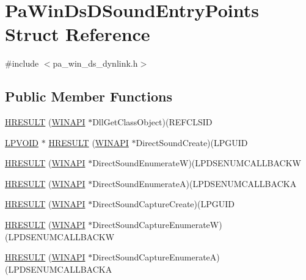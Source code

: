 \hypertarget{struct_pa_win_ds_d_sound_entry_points}{}\section{Pa\+Win\+Ds\+D\+Sound\+Entry\+Points Struct Reference}
\label{struct_pa_win_ds_d_sound_entry_points}


{\ttfamily \#include $<$pa\+\_\+win\+\_\+ds\+\_\+dynlink.\+h$>$}

\subsection*{Public Member Functions}
\begin{DoxyCompactItemize}
\item 
\hyperlink{struct_pa_win_ds_d_sound_entry_points_a7336ef5a37fdf17946fa6bf8c10c980f}{H\+R\+E\+S\+U\+LT} (\hyperlink{mapinls_8h_a9aa60e1ead64be77ad551e745cbfd4d3}{W\+I\+N\+A\+PI} $\ast$Dll\+Get\+Class\+Object)(R\+E\+F\+C\+L\+S\+ID
\item 
\hyperlink{struct_pa_win_ds_d_sound_entry_points_ae12b3be24bb1e429665a08c875adb886}{L\+P\+V\+O\+ID} $\ast$ \hyperlink{struct_pa_win_ds_d_sound_entry_points_aa9828d320537a6f0b176e9774435c655}{H\+R\+E\+S\+U\+LT} (\hyperlink{mapinls_8h_a9aa60e1ead64be77ad551e745cbfd4d3}{W\+I\+N\+A\+PI} $\ast$Direct\+Sound\+Create)(L\+P\+G\+U\+ID
\item 
\hyperlink{struct_pa_win_ds_d_sound_entry_points_afcbf02b4a50107a3013b3b62b80fea61}{H\+R\+E\+S\+U\+LT} (\hyperlink{mapinls_8h_a9aa60e1ead64be77ad551e745cbfd4d3}{W\+I\+N\+A\+PI} $\ast$Direct\+Sound\+EnumerateW)(L\+P\+D\+S\+E\+N\+U\+M\+C\+A\+L\+L\+B\+A\+C\+KW
\item 
\hyperlink{struct_pa_win_ds_d_sound_entry_points_a6af81a5fc0eed36269febd2614254a25}{H\+R\+E\+S\+U\+LT} (\hyperlink{mapinls_8h_a9aa60e1ead64be77ad551e745cbfd4d3}{W\+I\+N\+A\+PI} $\ast$Direct\+Sound\+EnumerateA)(L\+P\+D\+S\+E\+N\+U\+M\+C\+A\+L\+L\+B\+A\+C\+KA
\item 
\hyperlink{struct_pa_win_ds_d_sound_entry_points_ac7e63851c0870f044b91904bd15ed29d}{H\+R\+E\+S\+U\+LT} (\hyperlink{mapinls_8h_a9aa60e1ead64be77ad551e745cbfd4d3}{W\+I\+N\+A\+PI} $\ast$Direct\+Sound\+Capture\+Create)(L\+P\+G\+U\+ID
\item 
\hyperlink{struct_pa_win_ds_d_sound_entry_points_a87e7c8c017f4aef4cfb130d2a7257683}{H\+R\+E\+S\+U\+LT} (\hyperlink{mapinls_8h_a9aa60e1ead64be77ad551e745cbfd4d3}{W\+I\+N\+A\+PI} $\ast$Direct\+Sound\+Capture\+EnumerateW)(L\+P\+D\+S\+E\+N\+U\+M\+C\+A\+L\+L\+B\+A\+C\+KW
\item 
\hyperlink{struct_pa_win_ds_d_sound_entry_points_ab5b53b933f3362ef97e2cdc7e170c15b}{H\+R\+E\+S\+U\+LT} (\hyperlink{mapinls_8h_a9aa60e1ead64be77ad551e745cbfd4d3}{W\+I\+N\+A\+PI} $\ast$Direct\+Sound\+Capture\+EnumerateA)(L\+P\+D\+S\+E\+N\+U\+M\+C\+A\+L\+L\+B\+A\+C\+KA
\end{DoxyCompactItemize}
